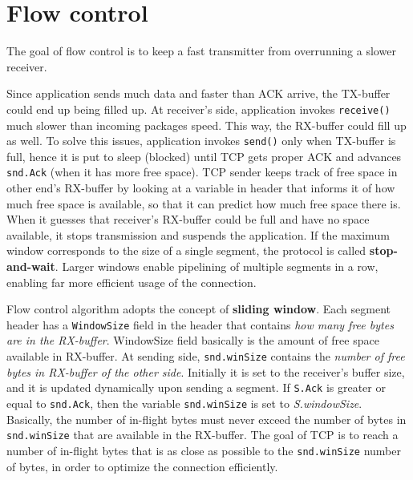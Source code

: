 \documentclass[10pt]{book}
\begin{document}
\section{Flow control}

The goal of flow control is to keep a fast transmitter from overrunning a
slower receiver.

Since application sends much data and faster than ACK arrive, the TX-buffer
could end up being filled up. At receiver's side, application invokes
\texttt{receive()} much slower than incoming packages speed. This way, the
RX-buffer could fill up as well. To solve this issues, application invokes
\texttt{send()} only when TX-buffer is full, hence it is put to sleep (blocked)
until TCP gets proper ACK and advances \texttt{snd.Ack} (when it has more free
space). TCP sender keeps track of free space in other end's RX-buffer by
looking at a variable in header that informs it of how much free space is
available, so that it can predict how much free space there is. When it guesses
that receiver's RX-buffer could be full and have no space available, it stops
transmission and suspends the application. If the maximum window corresponds to
the size of a single segment, the protocol is called \textbf{stop-and-wait}.
Larger windows enable pipelining of multiple segments in a row, enabling far
more efficient usage of the connection.

Flow control algorithm adopts the concept of \textbf{sliding window}. Each
segment header has a \texttt{WindowSize} field in the header that contains
\emph{how many free bytes are in the RX-buffer}. WindowSize field basically is
the amount of free space available in RX-buffer. At sending side,
\texttt{snd.winSize} contains the \emph{number of free bytes in RX-buffer of
the other side}. Initially it is set to the receiver's buffer size, and it is
updated dynamically upon sending a segment. If \texttt{S.Ack} is greater or
equal to \texttt{snd.Ack}, then the variable \texttt{snd.winSize} is set to
\emph{S.windowSize}. Basically, the number of in-flight bytes must never
exceed the number of bytes in \texttt{snd.winSize} that are available in the
RX-buffer. The goal of TCP is to reach a number of in-flight bytes that is as
close as possible to the \texttt{snd.winSize} number of bytes, in order to
optimize the connection efficiently.
\end{document}
